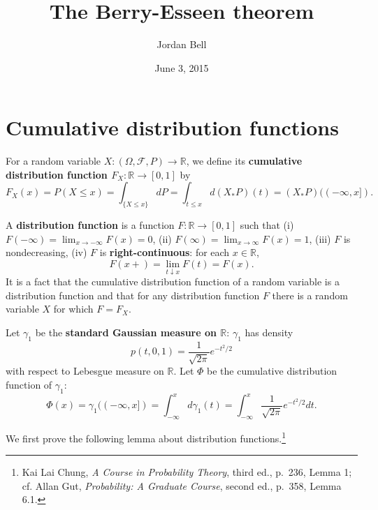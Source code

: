 \documentclass{article}
\theoremstyle{definition}
\theoremstyle{definition}
\begin{document}
\title{The Berry-Esseen theorem}
\author{Jordan Bell}
\date{June 3, 2015}

\maketitle

\section{Cumulative distribution functions}
For a random variable $X:(\Omega,\mathscr{F},P) \to \mathbb{R}$, we define its \textbf{cumulative distribution function $F_X:\mathbb{R} \to
[0,1]$} by
\[
F_X(x) = P(X \leq x) = \int_{\{X \leq x\}} dP = \int_{t \leq x} d(X_*P)(t)
=(X_*P)((-\infty,x]).
\]

A \textbf{distribution function} is a function $F:\mathbb{R} \to [0,1]$ such that (i)
$F(-\infty)=\lim_{x \to -\infty} F(x)=0$,
(ii) $F(\infty) = \lim_{x \to \infty} F(x)=1$,
(iii) $F$ is nondecreasing,
(iv) $F$ is \textbf{right-continuous}: for each $x \in \mathbb{R}$,
\[
F(x+)=\lim_{t \downarrow x} F(t) = F(x).
\] 
It is a fact that the
cumulative distribution function of a random variable is a distribution function and that for any
distribution function $F$ there is a random variable $X$ for which $F=F_X$. 

Let $\gamma_1$ be the \textbf{standard Gaussian measure on $\mathbb{R}$}: $\gamma_1$ has density
\[
p(t,0,1) = \frac{1}{\sqrt{2\pi}} e^{-t^2/2}
\]
with respect to Lebesgue measure on $\mathbb{R}$. 
Let $\Phi$ be the cumulative distribution function of $\gamma_1$:
\[
\Phi(x) =  \gamma_1((-\infty,x]) = \int_{-\infty}^x d\gamma_1(t) = 
\int_{-\infty}^x \frac{1}{\sqrt{2\pi}} e^{-t^2/2} dt.
\]



We first prove the following lemma about distribution functions.\footnote{Kai Lai Chung,
{\em A Course in Probability Theory}, third ed.,
p.~236, Lemma 1; cf. Allan Gut, {\em Probability: A Graduate Course}, second ed., p.~358, Lemma 6.1.}
\end{document}
